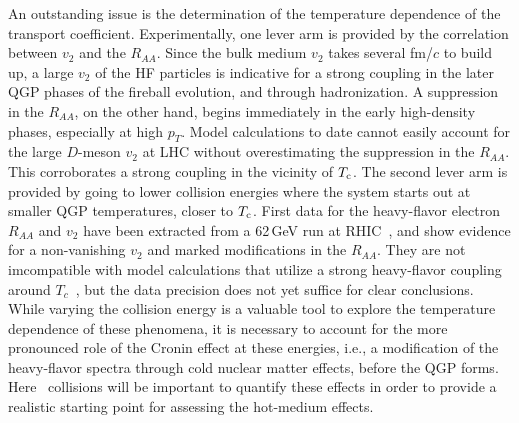  An outstanding  issue is the determination of the temperature dependence of the transport coefficient.  
 Experimentally, one lever arm is provided by the correlation between $v_2$ and the 
 $R_{AA}$. Since the bulk medium $v_2$ takes several fm/$c$ to build up, a large $v_2$ 
 of the HF particles is indicative for a strong coupling in the later QGP phases of the 
 fireball evolution, and through hadronization. 
 A suppression in the $R_{AA}$, on the other hand, begins immediately in the early 
 high-density phases, especially at high $p_T$. Model calculations to date
 cannot easily account for the large $D$-meson $v_2$ at LHC without overestimating 
 the suppression in the $R_{AA}$. This corroborates a strong coupling in the vicinity
 of $T_{\rm c}$. The second lever arm is provided by going to lower collision 
 energies where the system starts out at smaller QGP temperatures, closer to $T_{\rm c}$. 
 First data for the heavy-flavor electron $R_{AA}$ and $v_2$ have been extracted
 from a 62\,GeV run at RHIC~\cite{Adare:2014rly,Adamczyk:2014yew}, and show evidence 
 for a non-vanishing $v_2$ and marked modifications in the $R_{AA}$. They are not 
 imcompatible with model calculations that utilize a strong heavy-flavor coupling around 
 $T_c$~\cite{He:2014epa}, but the data precision does not yet suffice for clear conclusions. 
 While varying the collision energy is a valuable tool to explore the temperature 
 dependence of these phenomena, it is necessary to account for the 
 more pronounced role of the Cronin effect at these energies, i.e., 
 a modification of the heavy-flavor spectra through cold nuclear matter effects, before 
 the QGP forms. 
Here  \pA\ collisions will be important to quantify these effects in order to provide a realistic starting 
point for assessing the hot-medium effects. 
 
  

%
%

%

